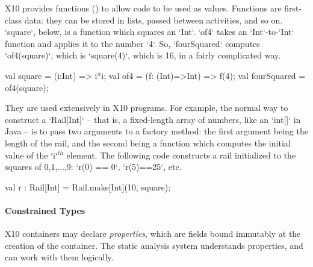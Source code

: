 X10 provides functions () to allow code to be used
as values.  Functions are first-class data: they can be stored in lists,
passed between activities, and so on.  \xcd`square`, below, is a function
which squares an \xcd`Int`.  \xcd`of4` takes an \xcd`Int`-to-\xcd`Int`
function and applies it to the number \xcd`4`.  So, \xcd`fourSquared` computes
\xcd`of4(square)`, which is \xcd`square(4)`, which is 16, in a fairly
complicated way.
\begin{xten}
  val square = (i:Int) => i*i;
  val of4 = (f: (Int)=>Int) => f(4);
  val fourSquared = of4(square);
\end{xten}



They are used extensively in X10
programs.  For example, the normal way to construct a \xcd`Rail[Int]` --
that is, a fixed-length array of numbers, like an \xcd`int[]` in Java -- is to
pass two arguments to a factory method: the first argument being the length of
the rail, and the second being a function which computes the initial value of
the \xcd`i`{$^{th}$} element.  The following code constructs a rail
initialized to the squares of 0,1,...,9: \xcd`r(0) == 0`, \xcd`r(5)==25`, etc. 
\begin{xten}
  val r : Rail[Int] = Rail.make[Int](10, square);
\end{xten}








\paragraph{Constrained Types}

X10 containers may declare {\em properties}, which are fields bound immutably
at the creation of the container.  The static analysis system understands
properties, and can work with them logically.   


